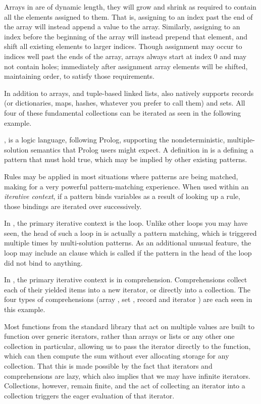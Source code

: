 Arrays in \Trilogy{} are of dynamic length, they will grow and shrink as required
to contain all the elements assigned to them. That is, assigning to an index past
the end of the array will instead append a value to the array. Similarly, assigning
to an index before the beginning of the array will instead prepend that element, and
shift all existing elements to larger indices. Though assignment may occur to indices
well past the ends of the array, arrays always start at index 0 and may not contain
holes; immediately after assignment array elements will be shifted, maintaining order,
to satisfy those requirements.

In addition to arrays, and tuple-based linked lists, \Trilogy{} also natively
supports records (or dictionaries, maps, hashes, whatever you prefer to call them)
and sets. All four of these fundamental collections can be iterated as seen in the
following example.


\Law{}, is a logic language, following Prolog, supporting the nondeterministic,
multiple-solution semantics that Prolog users might expect. A definition in \Law{}
is a  defining a pattern that must hold true, which may be implied by
other existing patterns.

Rules may be applied in most situations where patterns are being matched, making
for a very powerful pattern-matching experience. When used within an \emph{iterative
context}, if a pattern binds variables as a result of looking up a rule, those bindings
are iterated over successively.

In \Prose{}, the primary iterative context is the  loop. Unlike other
 loops you may have seen, the head of such a loop in \Prose{} is actually
a pattern matching, which is triggered multiple times by multi-solution patterns.
As an additional unusual feature, the  loop may include an  clause
which is called if the pattern in the head of the loop did not bind to anything.

In \Poetry{}, the primary iterative context is in comprehension. Comprehensions
collect each of their yielded items into a new iterator, or directly into a
collection. The four types of comprehensions (array \op{[]}, set \op{[||]},
record \op{\{||\}} and iterator \op{\$()}) are each seen in this example.

Most functions from the standard library that act on multiple values are built to
function over generic iterators, rather than arrays or lists or any other one
collection in particular, allowing us to pass the iterator directly to the
 function, which can then compute the sum without ever allocating storage
for any collection. That this is made possible by the fact that iterators
and comprehensions are lazy, which also implies that we may have infinite
iterators. Collections, however, remain finite, and the act of collecting
an iterator into a collection triggers the eager evaluation of that iterator.


